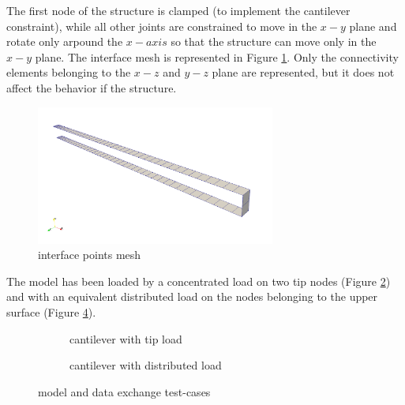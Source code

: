 The first node of the structure is clamped (to implement the cantilever constraint), while all other joints are constrained to move in the $x-y$ plane and rotate only arpound the $x-axis$ so that the structure can move only in the $x-y$ plane.
The interface mesh is represented in Figure \ref{fig:mbdyn-mesh}. Only the connectivity elements belonging to the $x-z$ and $y-z$ plane are represented, but it does not affect the behavior if the structure.


\begin{figure}[htbp!]
	\centering
	\includegraphics[width=0.7\textwidth]{images/example-mesh}
	\caption{interface points mesh}
	\label{fig:mbdyn-mesh}
\end{figure}

The model has been loaded by a concentrated load on two tip nodes (Figure \ref{fig:cnt-tip}) and with an equivalent distributed load on the nodes belonging to the upper surface (Figure \ref{fig:cnt-distrib}).

\begin{figure}[htbp!]
	    \begin{subfigure}{.8\textwidth}
	    \centering
    	\caption{cantilever with tip load}
		\label{fig:cnt-tip}
	    \end{subfigure}
	    \par\bigskip
	    \begin{subfigure}{.8\textwidth}
		\centering
    	\caption{cantilever with distributed load}
		\label{fig:cnt-distrib}
	    \end{subfigure}
	\caption{model and data exchange test-cases}
\end{figure}

